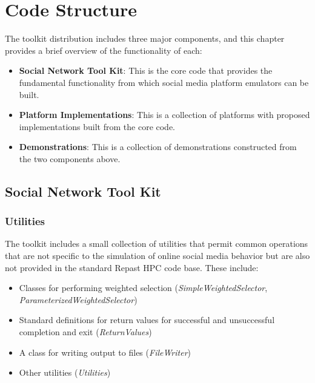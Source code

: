 
\chapter{Code Structure} \label{chap:CodeStructure}
The \rhpc toolkit distribution includes three major components, and this chapter provides a brief overview of the functionality of each:

\begin{itemize}
  \item \textbf{Social Network Tool Kit}: This is the core code that provides the fundamental functionality from which social media platform emulators can be built.
  \item \textbf{Platform Implementations}: This is a collection of platforms with proposed implementations built from the core code.
  \item \textbf{Demonstrations}: This is a collection of demonstrations constructed from the two components above.
\end{itemize} 

\section{Social Network Tool Kit}

\subsection{Utilities}
The \rhpc toolkit includes a small collection of utilities that permit common operations that are not specific to the simulation of online social media behavior but are also not provided in the standard Repast HPC code base. These include:


\begin{itemize}
  \item Classes for performing weighted selection (\textit{SimpleWeightedSelector}, \textit{ParameterizedWeightedSelector})
  \item Standard definitions for return values for successful and unsuccessful completion and exit (\textit{ReturnValues})
  \item A class for writing output to files (\textit{FileWriter})
  \item Other utilities (\textit{Utilities})
\end{itemize}

